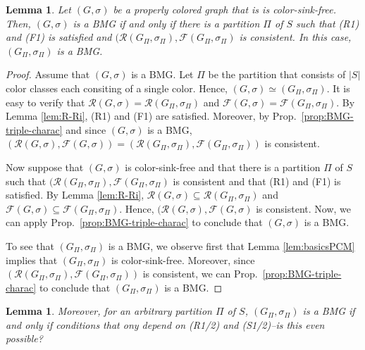 \documentclass[final,3p,times]{elsarticle}
\newtheorem{lemma}[theorem]{Lemma}%
\newcommand{\TODO}[1]{\begingroup\color{red}#1\endgroup}
\begin{document}
\begin{lemma}
    Let $(G,\sigma)$ be a properly colored graph that is  is color-sink-free. 
	Then, $(G,\sigma)$ is a BMG if and only if 
	there is a partition $\Pi$ of $S$ such that (R1) and (F1) is satisfied
	and $(\mathscr{R}(G_\Pi,\sigma_\Pi), \mathscr{F}(G_\Pi,\sigma_\Pi)$
	is consistent. In this case, $(G_\Pi,\sigma_\Pi)$ is a BMG. 
\end{lemma}
\begin{proof}
	Assume that $(G,\sigma)$ is a BMG. Let $\Pi$ be the partition that consists
	of $|S|$ color classes each consiting of a single color. Hence,
	$(G,\sigma)\simeq (G_\Pi,\sigma_\Pi)$. It is easy to verify that
	$\mathscr{R}(G,\sigma) = \mathscr{R}(G_\Pi,\sigma_\Pi)$ and
	$\mathscr{F}(G,\sigma) = \mathscr{F}(G_\Pi,\sigma_\Pi)$. By Lemma
	\ref{lem:R-Ri}, (R1) and (F1) are satisfied. Moreover, by Prop.\
	\ref{prop:BMG-triple-charac} and since $(G,\sigma)$ is a BMG,
	$(\mathscr{R}(G,\sigma), \mathscr{F}(G,\sigma)) =
	(\mathscr{R}(G_\Pi,\sigma_\Pi), \mathscr{F}(G_\Pi,\sigma_\Pi))$ is
	consistent.
	
	Now suppose that $(G,\sigma)$ is color-sink-free and that there is a
	partition $\Pi$ of $S$ such that $(\mathscr{R}(G_\Pi,\sigma_\Pi),
	\mathscr{F}(G_\Pi,\sigma_\Pi)$ is consistent and that (R1) and (F1) is
	satisfied. By Lemma \ref{lem:R-Ri}, $\mathscr{R}(G,\sigma) \subseteq
	\mathscr{R}(G_\Pi,\sigma_\Pi)$ and $\mathscr{F}(G,\sigma) \subseteq
	\mathscr{F}(G_\Pi,\sigma_\Pi)$. Hence, $(\mathscr{R}(G,\sigma)
	,\mathscr{F}(G,\sigma) $ is consistent. Now, we can apply Prop.\
	\ref{prop:BMG-triple-charac} to conclude that $(G,\sigma)$ is a BMG. 
	

	To see that $(G_\Pi,\sigma_\Pi)$ is a BMG, we observe first that Lemma
	\ref{lem:basicsPCM} implies that $(G_\Pi,\sigma_\Pi)$ is color-sink-free.
	Moreover, since $(\mathscr{R}(G_\Pi,\sigma_\Pi),
	\mathscr{F}(G_\Pi,\sigma_\Pi))$ is consistent, we can Prop.\
	\ref{prop:BMG-triple-charac} to conclude that $(G_\Pi,\sigma_\Pi)$ is a BMG.
\end{proof}

\begin{lemma}
	Moreover, for an arbitrary partition $\Pi$ of $S$, 
	 $(G_\Pi,\sigma_\Pi)$ is a BMG if and	only if
	 \TODO{conditions that ony depend on (R1/2) and (S1/2)--is this even possible?}
	 

\end{lemma}
\end{document}

